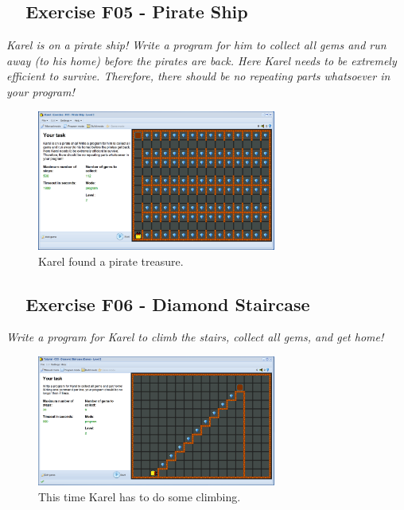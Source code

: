 \documentclass[article,A4,12pt]{llncs}
\begin{document}
\subsection{\ \ Exercise F05 - Pirate Ship}

{\em Karel is on a pirate ship! Write a program for him to collect all 
gems and run away (to his home) before the pirates are back. Here Karel 
needs to be extremely efficient to survive. Therefore, there should be 
no repeating parts whatsoever in your program!}


\begin{figure}[!ht]
\begin{center}
\includegraphics[width=0.7\textwidth]{img/f05.png}
\end{center}
\vspace{-4mm}
\caption{Karel found a pirate treasure.}
\label{fig:f05}
\vspace{-10mm}
\end{figure}
\noindent

\newpage
\subsection{\ \ Exercise F06 - Diamond Staircase}

{\em Write a program for Karel to climb the stairs, collect all gems, and get home!}


\begin{figure}[!ht]
\begin{center}
\includegraphics[width=0.7\textwidth]{img/g01.png}
\end{center}
\vspace{-4mm}
\caption{This time Karel has to do some climbing.}
\label{fig:g01}
\vspace{-4mm}
\end{figure}
\noindent
\end{document}
